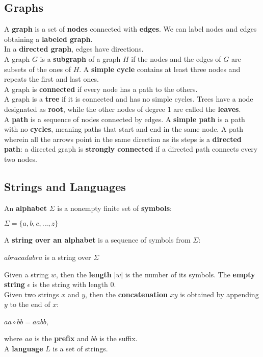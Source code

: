 \documentclass{article}
\begin{document}
\subsection{Graphs}
A \textbf{graph} is a set of \textbf{nodes} connected with \textbf{edges}. We can label nodes and edges obtaining a \textbf{labeled graph}. \\
In a \textbf{directed graph}, edges have directions. \\
A graph $G$ is a \textbf{subgraph} of a graph $H$ if the nodes and the edges of $G$ are subsets of the ones of $H$.
A \textbf{simple cycle} contains at least three nodes and repeats the first and last ones. \\
A graph is \textbf{connected} if every node has a path to the others. \\
A graph is a \textbf{tree} if it is connected and has no simple cycles.
Trees have a node designated as \textbf{root}, while the other nodes of degree $1$ are called the \textbf{leaves}. \\
A \textbf{path} is a sequence of nodes connected by edges. A \textbf{simple path} is a path with no \textbf{cycles}, meaning paths that start and end in the same node. A path wherein all the arrows point in the same direction as its steps is a \textbf{directed path}: a directed graph is \textbf{strongly connected} if a directed path connects every two nodes.
\subsection{Strings and Languages}
An \textbf{alphabet} $\Sigma$ is a nonempty finite set of \textbf{symbols}:
\begin{center}
    $\Sigma = \{a,b,c,...,z\}$
\end{center}
A \textbf{string over an alphabet} is a sequence of symbols from $\Sigma$:
\begin{center}
    $abracadabra$ is a string over $\Sigma$
\end{center}
Given a string $w$, then the \textbf{length} $|w|$ is the number of its symbols. The \textbf{empty string} $\epsilon$ is the string with length $0$. \\
Given two strings $x$ and $y$, then the \textbf{concatenation} $xy$ is obtained by appending $y$ to the end of $x$:
\begin{center}
    $aa \circ bb = aabb$,
\end{center}
where $aa$ is the \textbf{prefix} and $bb$ is the suffix. \\
A \textbf{language} $L$ is a set of strings.
\end{document}
